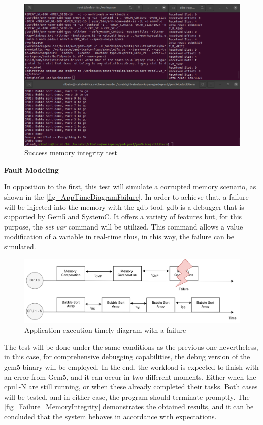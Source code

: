 \begin{figure}[H]
	\centering
 	\includegraphics[width=0.8\linewidth]{Images/Success_MemoryIntegrity.png} 
 	\caption{Success memory integrity test}
\end{figure}


\textbf{Fault Modeling}
\newline

In opposition to the first, this test will simulate a corrupted memory scenario, as shown in the \autoref{fig_AppTimeDiagramFailure}. 
In order to achieve that, a failure will be injected into the memory with the \gls{gdb} tool. \gls{gdb} is a debugger 
that is supported by Gem5 and SystemC. It offers a variety of features but, for this purpose, the \textit{set var} command will be utilized. 
This command allows a value modification of a variable in real-time thus, in this way, the failure can be simulated.

\begin{figure}[H]
	\centering
 	\includegraphics[width=0.8\linewidth]{Images/AppTimeDiagramFailure.png}
 	\caption{Application execution timely diagram with a failure}
	 \label{fig_AppTimeDiagramFailure}
\end{figure}


The test will be done under the same conditions as the previous one nevertheless, in this case, for comprehensive debugging capabilities, 
the debug version of the gem5 binary will be employed. In the end, the workload is expected to finish with an error from Gem5, and it can occur 
in two different moments. Either when the \gls{cpu}1-N are still running, or when these already completed their tasks. Both cases  
will be tested, and in either case, the program should terminate promptly. The \autoref{fig_Failure_MemoryIntegrity} demonstrates the obtained 
results, and it can be concluded that the system behaves in accordance with expectations.

